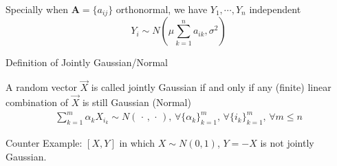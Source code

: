     Specially when 
    $\bm{A}=\{a_{ij}\}$ orthonormal, we have $Y_1,\cdots,Y_n$ independent
    \begin{equation}
        Y_i\sim N(\mu\sum_{k=1}^n a_{ik},\sigma^2)    
    \end{equation}

    \begin{point}
        Definition of Jointly Gaussian/Normal
    \end{point}

    A random vector $ \vec{X} $ is called jointly Gaussian if and only if any (finite) linear combination of $ \vec{X} $ is still Gaussian (Normal)
    \begin{align}
        \sum_{k=1}^m\alpha _{k}X_{i_k}\sim N(\, \cdot \, , \, \cdot \, ),\,\forall \{\alpha _k\}_{k=1}^m,\,\forall \{i_k\}_{k=1}^m,\,\forall m\leq n
    \end{align}

    Counter Example: $ [X,Y] $ in which $ X\sim N(0,1) $, $ Y=-X $ is not jointly Gaussian.
    
    
    

